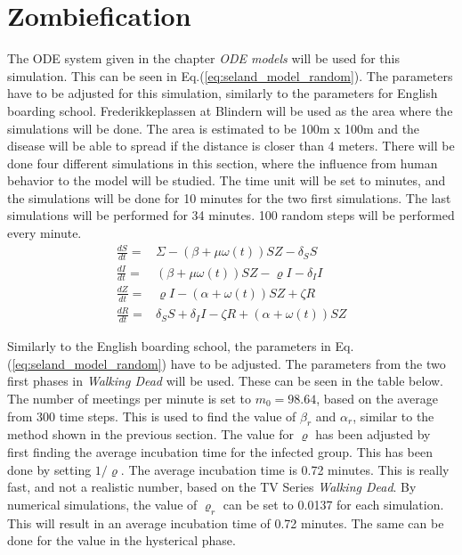 \documentclass[%
twoside,                 %
final,                   %
chapterprefix=true,      %
open=right               %
10pt]{book}
\begin{document}
\section{Zombiefication}
\label{section:3_zombiefication}
The ODE system given in the chapter \emph{ODE models} will be used for this simulation. This can be seen in Eq.(\ref{eq:seland_model_random}). The parameters have to be adjusted for this simulation, similarly to the parameters for English boarding school. Frederikkeplassen at Blindern will be used as the area where the simulations will be done. The area is estimated to be 100m x 100m and the disease will be able to spread if the distance is closer than 4 meters. There will be done four different simulations in this section, where the influence from human behavior to the model will be studied. The time unit will be set to minutes, and the simulations will be done for 10 minutes for the two first simulations. The last simulations will be performed for 34 minutes. 100 random steps will be performed every minute.       
\begin{equation} \label{eq:seland_model_random}
    \begin{aligned} 
    \frac{dS}{dt} =& \Sigma -(\beta+\mu \omega(t))SZ - \delta_SS \\
    \frac{dI}{dt} =& (\beta+\mu \omega(t))SZ - \varrho I - \delta_II\\
    \frac{dZ}{dt} =& \varrho I- (\alpha+\omega(t))SZ + \zeta R\\
    \frac{dR}{dt} =& \delta_SS +\delta_II -\zeta R + (\alpha+\omega(t))SZ 
    \end{aligned}
\end{equation}

Similarly to the English boarding school, the parameters in Eq.(\ref{eq:seland_model_random}) have to be adjusted. The parameters from the two first phases in \emph{Walking Dead} will be used. These can be seen in the table below. The number of meetings per minute is set to $m_0 = 98.64$, based on the average from 300 time steps. This is used to find the value of $\beta_r$ and $\alpha_r$, similar to the method shown in the previous section. The value for $\varrho$ has been adjusted by first finding the average incubation time for the infected group. This has been done by setting $1/\varrho$. The average incubation time is 0.72 minutes. This is really fast, and not a realistic number, based on the TV Series \emph{Walking Dead}. By numerical simulations, the value of $\varrho_r$ can be set to 0.0137 for each simulation. This will result in an average incubation time of 0.72 minutes. The same can be done for the value in the hysterical phase.  
\end{document}
